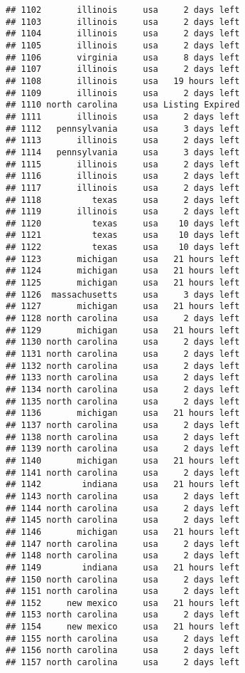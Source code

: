 \documentclass[
]{article}
\begin{document}
\begin{verbatim}
## 1102       illinois     usa     2 days left
## 1103       illinois     usa     2 days left
## 1104       illinois     usa     2 days left
## 1105       illinois     usa     2 days left
## 1106       virginia     usa     8 days left
## 1107       illinois     usa     2 days left
## 1108       illinois     usa   19 hours left
## 1109       illinois     usa     2 days left
## 1110 north carolina     usa Listing Expired
## 1111       illinois     usa     2 days left
## 1112   pennsylvania     usa     3 days left
## 1113       illinois     usa     2 days left
## 1114   pennsylvania     usa     3 days left
## 1115       illinois     usa     2 days left
## 1116       illinois     usa     2 days left
## 1117       illinois     usa     2 days left
## 1118          texas     usa     2 days left
## 1119       illinois     usa     2 days left
## 1120          texas     usa    10 days left
## 1121          texas     usa    10 days left
## 1122          texas     usa    10 days left
## 1123       michigan     usa   21 hours left
## 1124       michigan     usa   21 hours left
## 1125       michigan     usa   21 hours left
## 1126  massachusetts     usa     3 days left
## 1127       michigan     usa   21 hours left
## 1128 north carolina     usa     2 days left
## 1129       michigan     usa   21 hours left
## 1130 north carolina     usa     2 days left
## 1131 north carolina     usa     2 days left
## 1132 north carolina     usa     2 days left
## 1133 north carolina     usa     2 days left
## 1134 north carolina     usa     2 days left
## 1135 north carolina     usa     2 days left
## 1136       michigan     usa   21 hours left
## 1137 north carolina     usa     2 days left
## 1138 north carolina     usa     2 days left
## 1139 north carolina     usa     2 days left
## 1140       michigan     usa   21 hours left
## 1141 north carolina     usa     2 days left
## 1142        indiana     usa   21 hours left
## 1143 north carolina     usa     2 days left
## 1144 north carolina     usa     2 days left
## 1145 north carolina     usa     2 days left
## 1146       michigan     usa   21 hours left
## 1147 north carolina     usa     2 days left
## 1148 north carolina     usa     2 days left
## 1149        indiana     usa   21 hours left
## 1150 north carolina     usa     2 days left
## 1151 north carolina     usa     2 days left
## 1152     new mexico     usa   21 hours left
## 1153 north carolina     usa     2 days left
## 1154     new mexico     usa   21 hours left
## 1155 north carolina     usa     2 days left
## 1156 north carolina     usa     2 days left
## 1157 north carolina     usa     2 days left

\end{verbatim}
\end{document}
